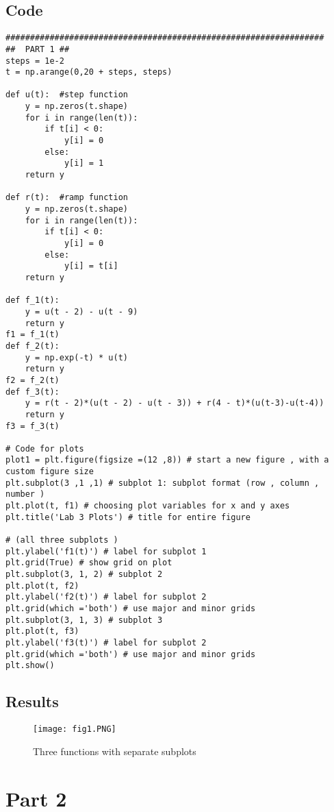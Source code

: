 \subsection*{Code}
\begin{scriptsize}
\begin{lstlisting}
#################################################################
##  PART 1 ##
steps = 1e-2
t = np.arange(0,20 + steps, steps)

def u(t):  #step function
    y = np.zeros(t.shape)
    for i in range(len(t)):
        if t[i] < 0:
            y[i] = 0
        else:
            y[i] = 1
    return y
    
def r(t):  #ramp function
    y = np.zeros(t.shape)   
    for i in range(len(t)):
        if t[i] < 0:
            y[i] = 0
        else:
            y[i] = t[i]
    return y
    
def f_1(t):
    y = u(t - 2) - u(t - 9)
    return y
f1 = f_1(t)
def f_2(t):
    y = np.exp(-t) * u(t)
    return y
f2 = f_2(t)
def f_3(t):
    y = r(t - 2)*(u(t - 2) - u(t - 3)) + r(4 - t)*(u(t-3)-u(t-4))
    return y
f3 = f_3(t)

# Code for plots
plot1 = plt.figure(figsize =(12 ,8)) # start a new figure , with a custom figure size
plt.subplot(3 ,1 ,1) # subplot 1: subplot format (row , column , number )
plt.plot(t, f1) # choosing plot variables for x and y axes
plt.title('Lab 3 Plots') # title for entire figure

# (all three subplots )
plt.ylabel('f1(t)') # label for subplot 1
plt.grid(True) # show grid on plot
plt.subplot(3, 1, 2) # subplot 2
plt.plot(t, f2)
plt.ylabel('f2(t)') # label for subplot 2
plt.grid(which ='both') # use major and minor grids
plt.subplot(3, 1, 3) # subplot 3
plt.plot(t, f3)
plt.ylabel('f3(t)') # label for subplot 2
plt.grid(which ='both') # use major and minor grids
plt.show()

\end{lstlisting}
\end{scriptsize}

\subsection{Results}

 \begin{figure}[H]
	   \centering
	   \texttt{[image: fig1.PNG]}
	   \caption{Three functions with separate subplots}
 \end{figure}


\section{Part 2}
